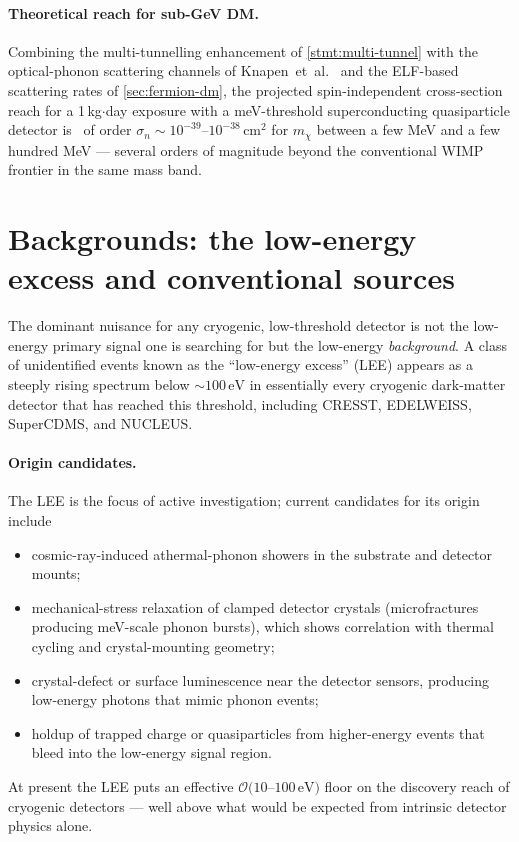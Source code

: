 \paragraph{Theoretical reach for sub-GeV DM.}
Combining the multi-tunnelling enhancement of
\cref{stmt:multi-tunnel} with the optical-phonon scattering
channels of Knapen~et~al.~\cite{knapen2018} and the ELF-based
scattering rates of \cref{sec:fermion-dm}, the projected
spin-independent cross-section reach for a 1\,kg$\cdot$day
exposure with a meV-threshold superconducting quasiparticle
detector is~\cite{kurinsky2020,knapen2018} of order
$\sigma_n\sim 10^{-39}\text{--}10^{-38}\,\text{cm}^2$ for
$m_\chi$ between a few MeV and a few hundred MeV --- several
orders of magnitude beyond the conventional WIMP frontier in the
same mass band.

\section{Backgrounds: the low-energy excess and conventional sources}
\label{sec:qp-backgrounds}

\begin{phenomenon}
The dominant nuisance for any cryogenic, low-threshold detector
is not the low-energy primary signal one is searching for but the
low-energy \emph{background}.  A class of unidentified events
known as the ``low-energy excess'' (LEE) appears as a steeply
rising spectrum below $\sim 100\,\text{eV}$ in essentially every
cryogenic dark-matter detector that has reached this threshold,
including CRESST, EDELWEISS, SuperCDMS, and NUCLEUS.
\end{phenomenon}

\paragraph{Origin candidates.}
The LEE is the focus of active investigation; current candidates
for its origin~\cite{adari2022} include
\begin{itemize}
  \item cosmic-ray-induced athermal-phonon showers in the
        substrate and detector mounts;
  \item mechanical-stress relaxation of clamped detector
        crystals (microfractures producing meV-scale phonon
        bursts), which shows correlation with thermal cycling and
        crystal-mounting geometry;
  \item crystal-defect or surface luminescence near the detector
        sensors, producing low-energy photons that mimic phonon
        events;
  \item holdup of trapped charge or quasiparticles from
        higher-energy events that bleed into the low-energy
        signal region.
\end{itemize}
At present the LEE puts an effective $\mathcal O(10$--$100\,\text{eV})$
floor on the discovery reach of cryogenic detectors --- well
above what would be expected from intrinsic detector physics
alone.


